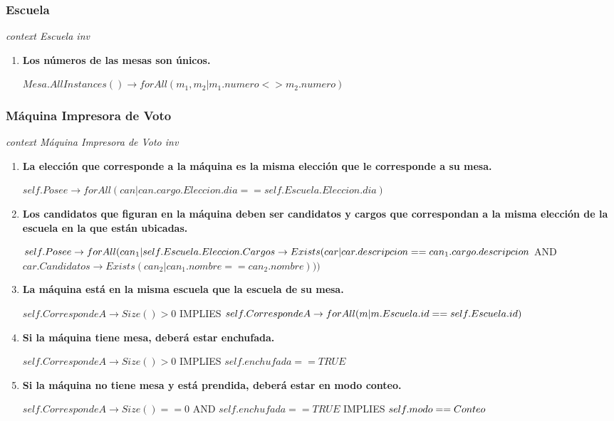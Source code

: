 \subsubsection*{Escuela}

\textit{context Escuela
inv}

\begin{enumerate}
\item \textbf{Los n\'umeros de las mesas son únicos.}

$Mesa.AllInstances() \rightarrow forAll(m_1, m_2|m_1.numero<>m_2.numero)$

\end{enumerate}

\subsubsection*{M\'aquina Impresora de Voto}

\textit{context M\'aquina Impresora de Voto
inv}

\begin{enumerate}
\item \textbf{La elecci\'on que corresponde a la m\'aquina es la misma elecci\'on que le corresponde a su mesa.}

$self.Posee \rightarrow forAll(can | can.cargo.Eleccion.dia == self.Escuela.Eleccion.dia)$

\item \textbf{Los candidatos que figuran en la m\'aquina deben ser candidatos y cargos que correspondan a la misma elecci\'on de la escuela en la que est\'an ubicadas.}

$self.Posee \rightarrow forAll(can_1 | self.Escuela.Eleccion.Cargos \rightarrow \\
Exists(car | car.descripcion == can_1.cargo.descripcion $ AND $car.Candidatos \rightarrow Exists(can_2| can_1.nombre == can_2.nombre)))$

\item \textbf{La m\'aquina est\'a en la misma escuela que la escuela de su mesa.}

$self.CorrespondeA \rightarrow Size() > 0$ IMPLIES $ \\
self.CorrespondeA \rightarrow forAll(m | m.Escuela.id == self.Escuela.id)$

\item \textbf{Si la m\'aquina tiene mesa, deber\'a estar enchufada.}

$self.CorrespondeA \rightarrow Size() > 0$ IMPLIES $ self.enchufada == TRUE$

\item \textbf{Si la m\'aquina no tiene mesa y est\'a prendida, deber\'a estar en modo conteo.} 

$self.CorrespondeA \rightarrow Size() == 0 $ AND $self.enchufada==TRUE$ IMPLIES $ \\
self.modo==Conteo$

\end{enumerate}

